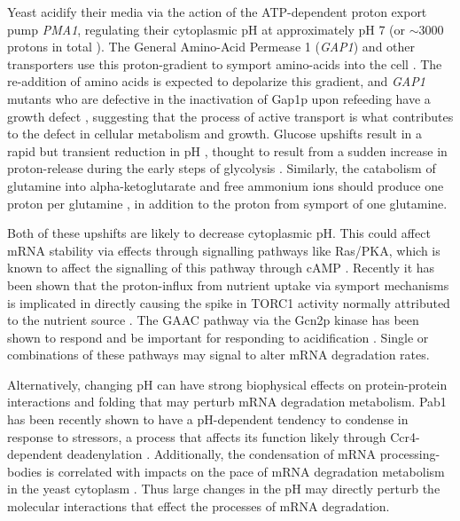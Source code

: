Yeast acidify their media via the action of the ATP-dependent
proton export pump \textit{PMA1}, regulating their cytoplasmic pH
at approximately pH 7 (or $\sim$3000 protons in total 
\cite{orij2011intracellular}).
The General Amino-Acid Permease 1 (\textit{GAP1}) and other
transporters use this proton-gradient to symport amino-acids into
the cell \parencite{grenson1992amino}. 
The re-addition of amino acids is expected to depolarize this 
gradient, and \textit{GAP1} mutants who are defective in the 
inactivation of Gap1p upon refeeding have a growth defect
\parencite{risinger2006activity}, suggesting that the process of
active transport is what contributes to the defect in cellular 
metabolism and growth.
Glucose upshifts result in a rapid but transient reduction in pH
\parencite{kresnowati2008quantitative}, thought to result from
a sudden increase in proton-release during the early steps of 
glycolysis \parencite{orij2011intracellular}.
Similarly, the catabolism of glutamine into alpha-ketoglutarate
and free ammonium ions should produce one proton per glutamine
\parencite{magasanik2002nitrogen}, in addition to the proton
from symport of one glutamine.

Both of these upshifts are likely to decrease cytoplasmic pH.
This could affect mRNA stability via effects through signalling
pathways like Ras/PKA, which is known to affect the signalling
of this pathway through cAMP \parencite{orij2011intracellular}.
Recently it has been shown that the proton-influx from nutrient uptake
via symport mechanisms is implicated in directly causing the spike
in TORC1 activity normally attributed to the nutrient source 
\parencite{saliba2018yeast}. 
The GAAC pathway via the Gcn2p kinase has been shown to respond
and be important for responding to acidification 
\parencite{hueso2012novel}.
Single or combinations of these pathways may signal to alter
mRNA degradation rates.

Alternatively, changing pH can have strong biophysical effects on
protein-protein interactions and folding that may perturb mRNA
degradation metabolism. 
Pab1 has been recently shown to have a pH-dependent tendency to
condense in response to stressors, a process that affects its 
function likely through Ccr4-dependent deadenylation
\parencite{riback2017stress,yao2007pab1}.
Additionally, the condensation of mRNA processing-bodies is 
correlated with impacts on the pace of mRNA degradation metabolism 
in the yeast cytoplasm \parencite{huch2017mrna, rao2017numerous}.
Thus large changes in the pH may directly perturb the molecular
interactions that effect the processes of mRNA degradation.

